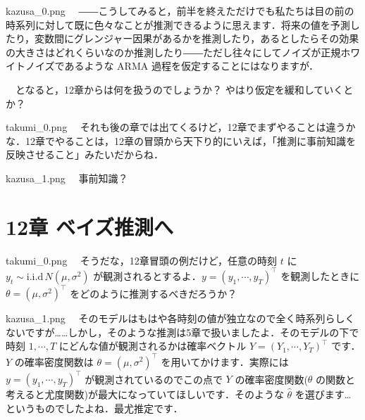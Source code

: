 \documentclass[b5paper,xelatex,ja=standard,10pt]{bxjsarticle}
\begin{document}
\begin{SERIFU}[colback=PaleIris]{kazusa_0.png}
　――こうしてみると，前半を終えただけでも私たちは目の前の時系列に対して既に色々なことが推測できるように思えます．将来の値を予測したり，変数間にグレンジャー因果があるかを推測したり，あるとしたらその効果の大きさはどれくらいなのか推測したり――ただし往々にしてノイズが正規ホワイトノイズであるような ARMA 過程を仮定することにはなりますが．

　となると，12章からは何を扱うのでしょうか？ やはり仮定を緩和していくとか？
\end{SERIFU}


\begin{SERIFU}[colback=PaleGold]{takumi_0.png}
　それも後の章では出てくるけど，12章でまずやることは違うかな．12章でやることは，12章の冒頭から天下り的にいえば，{「推測に事前知識を反映させること」}みたいだからね．
\end{SERIFU}


\begin{SERIFU}[colback=PaleIris]{kazusa_1.png}
　事前知識？
\end{SERIFU}


\section*{12章 ベイズ推測へ}


\begin{SERIFU}[colback=PaleGold]{takumi_0.png}
　そうだな，12章冒頭の例だけど，任意の時刻 $t$ に $y_t \sim \mathrm{i.i.d} \, N(\mu, \sigma^2)$ が観測されるとするよ．$y = (y_1, \cdots, y_T)^\top$ を観測したときに $\theta = (\mu, \sigma^2)^\top$ をどのように推測するべきだろうか？
\end{SERIFU}


\begin{SERIFU}[colback=PaleIris]{kazusa_1.png}
　そのモデルはもはや各時刻の値が独立なので全く時系列らしくないですが……しかし，そのような推測は5章で扱いましたよ．そのモデルの下で時刻 $1, \cdots, T$ にどんな値が観測されるかは確率ベクトル $Y = (Y_1, \cdots, Y_T)^\top$ です．$Y$ の確率密度関数は $\theta = (\mu, \sigma^2)^\top$ を用いてかけます．実際には $y = (y_1, \cdots, y_T)^\top$ が観測されているのでこの点で $Y$ の確率密度関数($\theta$ の関数と考えると尤度関数)が最大になっていてほしいです．そのような $\hat{\theta}$ を選びます…というものでしたよね．最尤推定です．
\end{SERIFU}
\end{document}
